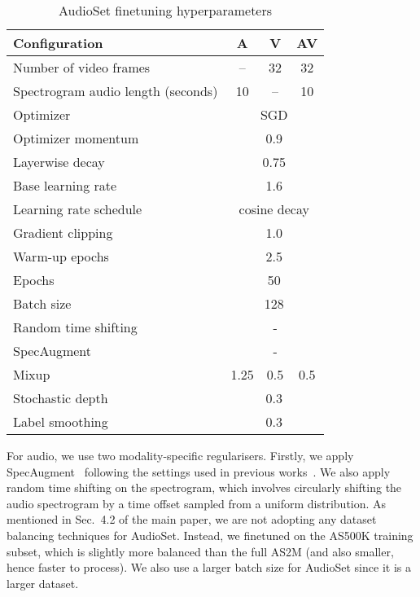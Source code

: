 \documentclass[10pt,twocolumn,letterpaper]{article}
\begin{document}
\begin{table}[th] 
	\caption{ AudioSet finetuning hyperparameters
	}
	\vspace{-0.6\baselineskip}
	\centering
		\begin{tabular}{lccc}
			\toprule
			Configuration        & A &  V & AV \\
			\midrule
			Number of video frames     & -- & 32 & 32\\
			Spectrogram audio length (seconds)    & 10 & -- & 10  \\
			\midrule
			Optimizer              & \multicolumn{3}{c}{SGD}         \\
			Optimizer momentum        & \multicolumn{3}{c}{0.9}         \\
			Layerwise decay~\cite{bao2021beit, clark2020electra}    & \multicolumn{3}{c}{0.75}      \\
			Base learning rate          & \multicolumn{3}{c}{1.6}  \\
			Learning rate schedule     & \multicolumn{3}{c}{cosine decay} \\
			Gradient clipping        & \multicolumn{3}{c}{1.0} \\  
			Warm-up epochs          & \multicolumn{3}{c}{2.5} \\
			Epochs                 & \multicolumn{3}{c}{50} \\
			Batch size             & \multicolumn{3}{c}{128} \\
			\midrule
			Random time shifting     & \checkmark     & -    &  \checkmark  \\
			SpecAugment \cite{park2019specaugment}   & \checkmark     & -  & \checkmark \\
			Mixup  \cite{zhang_mixup_iclr_2018}           & 1.25  & 0.5 & 0.5 \\ Stochastic depth  \cite{huang_stochasticdepth_eccv_2016}    & \multicolumn{3}{c}{0.3} \\
			Label smoothing  \cite{szegedy_cvpr_2016}      & \multicolumn{3}{c}{0.3} \\
			\bottomrule
		\end{tabular}
		\label{tab:hyperparams_audioset}
\end{table}
 

For audio, we use two modality-specific regularisers.
Firstly, we apply SpecAugment~\cite{park2019specaugment} following the settings used in previous works~\cite{nagrani2021attention, gong2021ast}.
We also apply random time shifting on the spectrogram, which involves circularly shifting the audio spectrogram by a time offset sampled from a uniform distribution.
As mentioned in Sec.~4.2 of the main paper, we are not adopting any dataset balancing techniques for AudioSet.
Instead, we finetuned on the AS500K training subset, which is slightly more balanced than the full AS2M (and also smaller, hence faster to process).
We also use a larger batch size for AudioSet since it is a larger dataset.
\end{document}
